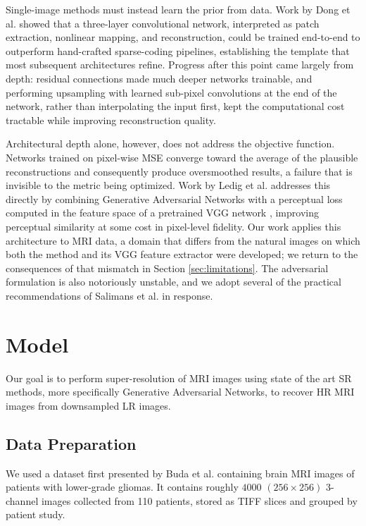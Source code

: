 \documentclass[conference]{IEEEtran}
\begin{document}
Single-image methods must instead learn the prior from data. Work by Dong et al. \cite{dong2015image} showed that a three-layer convolutional network, interpreted as patch extraction, nonlinear mapping, and reconstruction, could be trained end-to-end to outperform hand-crafted sparse-coding pipelines, establishing the template that most subsequent architectures refine. Progress after this point came largely from depth: residual connections made much deeper networks trainable, and performing upsampling with learned sub-pixel convolutions at the end of the network, rather than interpolating the input first, kept the computational cost tractable while improving reconstruction quality.

Architectural depth alone, however, does not address the objective function. Networks trained on pixel-wise MSE converge toward the average of the plausible reconstructions and consequently produce oversmoothed results, a failure that is invisible to the metric being optimized. Work by Ledig et al. \cite{ledig2017photo} addresses this directly by combining Generative Adversarial Networks \cite{goodfellow2020generative} with a perceptual loss computed in the feature space of a pretrained VGG network \cite{simonyan2014very}, improving perceptual similarity at some cost in pixel-level fidelity. Our work applies this architecture to MRI data, a domain that differs from the natural images on which both the method and its VGG feature extractor were developed; we return to the consequences of that mismatch in Section \ref{sec:limitations}. The adversarial formulation is also notoriously unstable, and we adopt several of the practical recommendations of Salimans et al. \cite{salimans2016improved} in response.

\section{Model}
Our goal is to perform super-resolution of MRI images using state of the art SR methods, more specifically Generative Adversarial Networks, to recover HR MRI images from downsampled LR images. 
\subsection{Data Preparation}
We used a dataset first presented by Buda et al. \cite{buda2019association} containing brain MRI images of patients with lower-grade gliomas. It contains roughly $4000$ $(256 \times 256)$ $3$-channel images collected from 110 patients, stored as TIFF slices and grouped by patient study.
\end{document}
